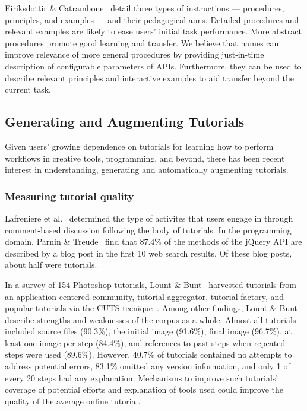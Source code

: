 Eiriksdottir \& Catrambone~\cite{eiriksdottir_procedural_2011} detail three types of instructions --- procedures, principles, and examples --- and their pedagogical aims.
Detailed procedures and relevant examples are likely to ease users' initial task performance.
More abstract procedures promote good learning and transfer.
We believe that \glspl{name} can improve relevance of more general procedures by providing just-in-time description of configurable parameters of APIs.
Furthermore, they can be used to describe relevant principles and interactive examples to aid transfer beyond the current task.


\subsection{Generating and Augmenting Tutorials}

Given users' growing dependence on tutorials for learning how to perform workflows in creative tools, programming, and beyond, there has been recent interest in understanding, generating and automatically augmenting tutorials.

\subsubsection{Measuring tutorial quality}

Lafreniere et al.~\cite{lafreniere_understanding_2013} determined the type of activites that users engage in through comment-based discussion following the body of tutorials.
In the programming domain, Parnin \& Treude~\cite{parnin_measuring_2011} find that 87.4\% of the methods of the jQuery API are described by a blog post in the first 10 web search results.
Of these blog posts, about half were tutorials.

In a survey of 154 Photoshop tutorials, Lount \& Bunt~\cite{lount_characterizing_2014} harvested tutorials from an application-centered community, tutorial aggregator, tutorial factory, and popular tutorials via the CUTS tecnique~\cite{fourney_characterizing_2011}.
Among other findings, Lount \& Bunt describe strengths and weaknesses of the corpus as a whole.
Almost all tutorials included source files (90.3\%), the initial image (91.6\%), final image (96.7\%), at least one image per step (84.4\%), and references to past steps when repeated steps were used (89.6\%).
However, 40.7\% of tutorials contained no attempts to address potential errors, 83.1\% omitted any version information, and only 1 of every 20 steps had any explanation.
Mechanisms to improve such tutorials' coverage of potential efforts and explanation of tools used could improve the quality of the average online tutorial.

